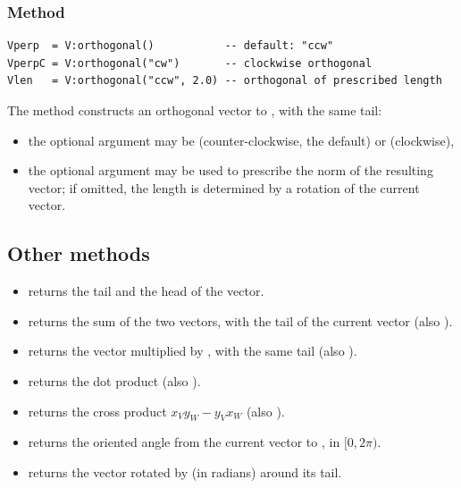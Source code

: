 \subsubsection{Method  }
\label{ssub:method_vector_orthogonal_r}

\begin{verbatim}
Vperp  = V:orthogonal()           -- default: "ccw"
VperpC = V:orthogonal("cw")       -- clockwise orthogonal
Vlen   = V:orthogonal("ccw", 2.0) -- orthogonal of prescribed length
\end{verbatim}

The  method constructs an orthogonal vector to ,
with the same tail:
\begin{itemize}
  \item the optional argument  may be  (counter-clockwise,
        the default) or  (clockwise),
  \item the optional argument  may be used to prescribe the norm
        of the resulting vector; if omitted, the length is determined by a rotation
        of the current vector.
\end{itemize}

\subsection{Other methods}
\label{sub:vector_other_methods}

\begin{itemize}
  \item {} returns the tail and the head of the vector.
  \item {} returns the sum of the two vectors, with the
        tail of the current vector (also ).
  \item {} returns the vector multiplied by ,
        with the same tail (also ).
  \item {} returns the dot product (also ).
  \item {} returns the cross product
        $x_V y_W - y_V x_W$ (also ).
  \item {} returns the oriented angle from the
        current vector to , in $[0, 2\pi)$.
  \item {} returns the vector rotated by
         (in radians) around its tail.
\end{itemize}

